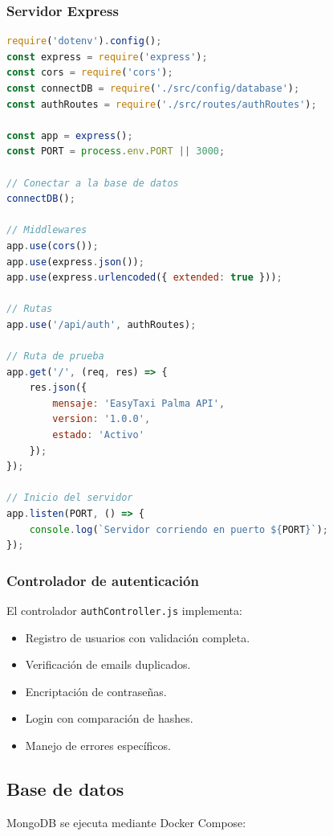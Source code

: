 \documentclass[12pt,a4paper]{article}
\begin{document}
\subsubsection{Servidor Express}

\begin{lstlisting}[language=JavaScript, caption=Configuración del servidor]
require('dotenv').config();
const express = require('express');
const cors = require('cors');
const connectDB = require('./src/config/database');
const authRoutes = require('./src/routes/authRoutes');

const app = express();
const PORT = process.env.PORT || 3000;

// Conectar a la base de datos
connectDB();

// Middlewares
app.use(cors());
app.use(express.json());
app.use(express.urlencoded({ extended: true }));

// Rutas
app.use('/api/auth', authRoutes);

// Ruta de prueba
app.get('/', (req, res) => {
    res.json({
        mensaje: 'EasyTaxi Palma API',
        version: '1.0.0',
        estado: 'Activo'
    });
});

// Inicio del servidor
app.listen(PORT, () => {
    console.log(`Servidor corriendo en puerto ${PORT}`);
});
\end{lstlisting}

\subsubsection{Controlador de autenticación}

El controlador \texttt{authController.js} implementa:

\begin{itemize}
    \item Registro de usuarios con validación completa.
    \item Verificación de emails duplicados.
    \item Encriptación de contraseñas.
    \item Login con comparación de hashes.
    \item Manejo de errores específicos.
\end{itemize}

\subsection{Base de datos}

MongoDB se ejecuta mediante Docker Compose:
\end{document}
